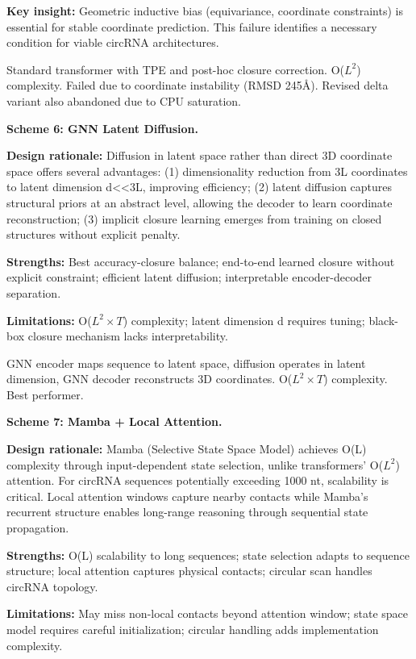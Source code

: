 \documentclass[12pt]{article}
\begin{document}
\textbf{Key insight:} Geometric inductive bias (equivariance, coordinate constraints) is essential for stable coordinate prediction. This failure identifies a necessary condition for viable circRNA architectures.

Standard transformer with TPE and post-hoc closure correction. O($L^2$) complexity. Failed due to coordinate instability (RMSD 245\AA). Revised delta variant also abandoned due to CPU saturation.

\textbf{Scheme 6: GNN Latent Diffusion.}

\textbf{Design rationale:} Diffusion in latent space rather than direct 3D coordinate space offers several advantages: (1) dimensionality reduction from 3L coordinates to latent dimension d<<3L, improving efficiency; (2) latent diffusion captures structural priors at an abstract level, allowing the decoder to learn coordinate reconstruction; (3) implicit closure learning emerges from training on closed structures without explicit penalty.

\textbf{Strengths:} Best accuracy-closure balance; end-to-end learned closure without explicit constraint; efficient latent diffusion; interpretable encoder-decoder separation.

\textbf{Limitations:} O($L^2 \times T$) complexity; latent dimension d requires tuning; black-box closure mechanism lacks interpretability.

GNN encoder maps sequence to latent space, diffusion operates in latent dimension, GNN decoder reconstructs 3D coordinates. O($L^2 \times T$) complexity. Best performer.

\textbf{Scheme 7: Mamba + Local Attention.}

\textbf{Design rationale:} Mamba (Selective State Space Model) \citep{gu2023} achieves O(L) complexity through input-dependent state selection, unlike transformers' O($L^2$) attention. For circRNA sequences potentially exceeding 1000 nt, scalability is critical. Local attention windows capture nearby contacts while Mamba's recurrent structure enables long-range reasoning through sequential state propagation.

\textbf{Strengths:} O(L) scalability to long sequences; state selection adapts to sequence structure; local attention captures physical contacts; circular scan handles circRNA topology.

\textbf{Limitations:} May miss non-local contacts beyond attention window; state space model requires careful initialization; circular handling adds implementation complexity.
\end{document}
